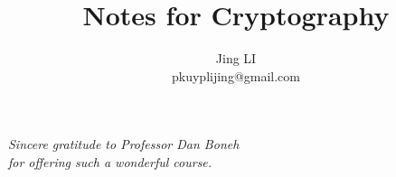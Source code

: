 
\def\PREAMBLE{PREAMBLE}
\title{Notes for Cryptography}
\author{Jing LI\\pkuyplijing@gmail.com}

\pagestyle{empty}
\hypersetup{pageanchor=false}
\maketitle
\begin{center}
\emph{Sincere gratitude to Professor Dan Boneh\\for offering such a wonderful course.}
\end{center}
\tableofcontents
\newpage
\hypersetup{pageanchor=true}
\pagestyle{headings}



